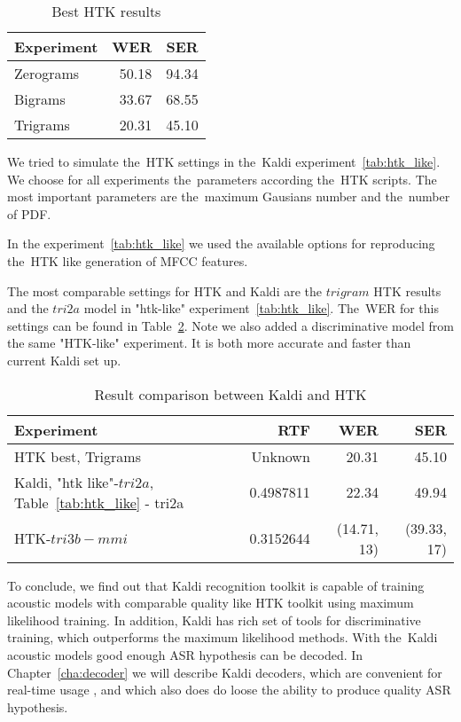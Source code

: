 \begin{table}[!htp]\label{tab:htk_res}\centering\begin{tabular}{l|rr}
Experiment      & \ac{WER} & \ac{SER} \\
\hline
    Zerograms      & 50.18  & 94.34  \\
    Bigrams        & 33.67  & 68.55  \\
    Trigrams       & 20.31  & 45.10  \\
\end{tabular}
\caption{Best \ac{HTK} results}
\end{table}  

We tried to simulate the~\ac{HTK} settings in the~Kaldi experiment~\ref{tab:htk_like}.
We choose for all experiments the~parameters according the~\ac{HTK} scripts.
The most important parameters are the~maximum Gausians number and the~number of \acl{PDF}.

In the experiment~\ref{tab:htk_like} we used the available options for reproducing the~\ac{HTK} like generation
of \ac{MFCC} features.

The most comparable settings for \ac{HTK} and Kaldi are the $trigram$ \ac{HTK} results
and the $tri2a$ model in "htk-like" experiment~\ref{tab:htk_like}. 
The~\ac{WER} for this settings can be found in Table~\ref{tab:compare}.
Note we also added a discriminative model from the same "\ac{HTK}-like" experiment.
It is both more accurate and faster than current Kaldi set up.

\begin{table}[!htp]\label{tab:compare}\centering\begin{tabular}{l|rrr}
    Experiment   & \ac{RTF} & \ac{WER} & \ac{SER} \\
\hline
\hline
\ac{HTK} best, Trigrams   & Unknown  & 20.31  & 45.10  \\
Kaldi, "htk like"-$tri2a$, Table~\ref{tab:htk_like} - tri2a & 0.4987811 & 22.34 & 49.94\\
\hline
\ac{HTK}-$tri3b-mmi$       & 0.3152644     & (14.71, 13) & (39.33, 17)\\ 
\end{tabular} \caption{Result comparison between Kaldi and \ac{HTK}} \end{table}  

To conclude, we find out that Kaldi recognition toolkit is capable of training acoustic models with comparable quality like \ac{HTK} toolkit using maximum likelihood training. In addition, Kaldi has rich set of tools for discriminative training, which outperforms the maximum likelihood methods.
With the~Kaldi acoustic models good enough ASR hypothesis can be decoded. 
In Chapter~\ref{cha:decoder} we will describe Kaldi decoders, which are convenient for real-time usage
, and which also does do loose the ability to produce quality ASR hypothesis.




